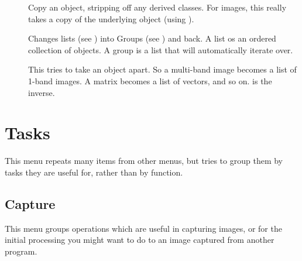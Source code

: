 \begin{description}

\item[]
	Copy an object, stripping off any derived classes. For images, this
	really takes a copy of the underlying object (using ).

\item[]
	Changes lists (see ) into Groups (see
	) and back. A list os an ordered collection of
	objects. A group is a list that \nip{} will automatically iterate
	over.

\item[]
	This tries to take an object apart. So a multi-band image becomes a
	list of 1-band images. A matrix becomes a list of vectors, and so on.
	 is the inverse.

\end{description}

\section{Tasks}

This menu repeats many items from other menus, but tries to group them by
tasks they are useful for, rather than by function.

\subsection{Capture}

This menu groups operations which are useful in capturing images, or for the
initial processing you might want to do to an image captured from another
program.

